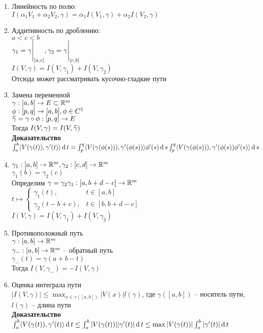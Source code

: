 \documentclass[12pt]{article}
\begin{document}
\begin{enumerate}
    \item Линейность по полю:\\
    $I(\alpha_1 V_1 + \alpha_2 V_2, \gamma) = \alpha_1 I(V_1, \gamma) + \alpha_2 I(V_2, \gamma)$
    \item Аддитивность по дроблению:\\
    $a < c < b$\\
    $\gamma_1 = \gamma\Biggr|_{[a, c]}, \gamma_2 = \gamma\Biggr|_{[c,b]}$\\
    $I(V, \gamma) = I(V, \gamma_1) + I(V, \gamma_2)$\\
    Отсюда может рассматривать кусочно-гладкие пути
    \item Замена переменной\\
    $\gamma:[a,b] \rightarrow E\subset \mathbb{R}^m$\\
    $\phi:[p, q] \rightarrow [a,b], \phi\in C^1$\\
    $\widetilde\gamma = \gamma \circ \phi: [p, q] \rightarrow E$\\
    Тогда $I(V, \gamma) = I(V, \widetilde \gamma)$\\
    \textbf{Доказательство}\\
    $\int_a^b \langle V(\gamma(t)), \gamma'(t)\rangle \operatorname{d} t = \int_p^q \langle V(\gamma(\phi(s))), \gamma'(\phi(s))\rangle \phi'(s)\operatorname{d} s \int_p^q \langle V(\gamma(\phi(s))), \gamma'(\phi(s))\phi'(s)\rangle\operatorname{d} s$
    \item $\gamma_1: [a, b] \rightarrow \mathbb{R}^m, \gamma_2:[c,d]\rightarrow \mathbb{R}^m$\\
    $\gamma_1(b) = \gamma_2(c)$\\
    Определим $\gamma = \gamma_2\gamma_1: [a, b+d-c] \rightarrow \mathbb{R}^m$\\
    $t \mapsto \left\{\begin{array}{ll}
        \gamma_1(t), & t \in [a,b]\\
        \gamma_2(t - b + c), & t \in [b, b+d-c]
    \end{array}\right.$\\
    $I(V, \gamma) = I(V, \gamma_1) + I(V, \gamma_2)$
    \item Противоположный путь\\
    $\gamma:[a,b] \rightarrow \mathbb{R}^m$\\
    $\gamma_-:[a,b]\rightarrow \mathbb{R}^m$ -- обратный путь\\
    $\gamma_-(t) = \gamma(a+b-t)$\\
    Тогда $I(V,\gamma_-) = -I(V, \gamma)$
    \item Оценка интеграла пути\\
    $|I(V, \gamma)| \leq \max_{x \in \gamma([a,b])}|V(x)|l(\gamma)$, где $\gamma([a,b])$ -- носитель пути, $l(\gamma)$ -- длина пути\\
    \textbf{Доказательство}\\
    $\int_a^b \langle V(\gamma(t)), \gamma'(t)\rangle \operatorname{d} t \leq \int_a^b |V(\gamma(t))| |\gamma'(t)| \operatorname{d} t\leq \max |V(\gamma(t))| \int_a^b |\gamma'(t)| \operatorname{d} t$
\end{enumerate}
\end{document}
